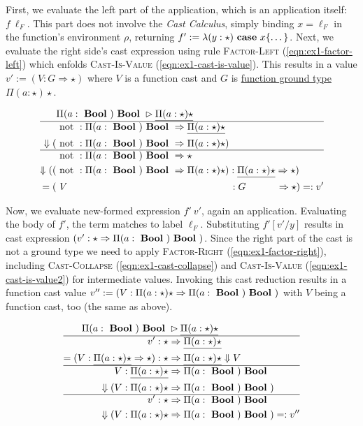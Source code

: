 First, we evaluate the left part of the application, which is an application itself: $f~\ell_F$. This part does not involve the \emph{Cast Calculus}, simply binding $x=\ell_F$ in the function's environment $\rho$, returning $f' := \lambda (y:\star) \text{ \textbf{case} } x \{ \dots \}$. Next, we evaluate the right side's cast expression using rule \textsc{Factor-Left} (\ref{eqn:ex1-factor-left}) which enfolds \textsc{Cast-Is-Value} (\ref{eqn:ex1-cast-is-value}). This results in a value $v' := (V : G \Rightarrow \star)$ where $V$ is a function cast and $G$ is \underline{function ground type} $\Pi(a:\star)\star$.

\begin{align}
& \Pi(a:\Bool) \Bool \rhd \underline{\Pi(a:\star) \star} \\ \hline
& \notf : \Pi(a:\Bool) \Bool \Rightarrow \underline{\Pi(a:\star) \star} \\
\Downarrow ( & \notf : \Pi(a:\Bool) \Bool \Rightarrow \Pi(a:\star) \star ) \label{eqn:ex1-cast-is-value} \\ \hline
& \notf : \Pi(a:\Bool) \Bool \Rightarrow \star \\
\Downarrow (( & \notf : \Pi(a:\Bool) \Bool \Rightarrow \Pi(a:\star) \star) : \underline{\Pi(a:\star) \star} \Rightarrow \star) \label{eqn:ex1-factor-left} \\
= (& ~V \hspace{16.6em} : G \hspace{3.1em} \Rightarrow \star) =: v'
\end{align}

Now, we evaluate new-formed expression $f'~v'$, again an application. Evaluating the body of $f'$, the \case term matches to label $\ell_F$. Substituting $f'[v'/y]$ results in cast expression $(v' : \star \Rightarrow \Pi(a:\text{ \textbf{Bool} }) \text{ \textbf{Bool} })$. Since the right part of the cast is not a ground type we need to apply \textsc{Factor-Right} (\ref{eqn:ex1-factor-right}), including \textsc{Cast-Collapse} (\ref{eqn:ex1-cast-collapse}) and \textsc{Cast-Is-Value} (\ref{eqn:ex1-cast-is-value2}) for intermediate values. Invoking this cast reduction results in a function cast value $v'' := (V : \Pi(a: \star) \star \Rightarrow \Pi(a:\text{ \textbf{Bool} }) \text{ \textbf{Bool} })$ with $V$ being a function cast, too (the same as above).

\begin{align}
\Pi(a:\text{ \textbf{Bool} }) \text{ \textbf{Bool} } & \rhd \underline{\Pi(a:\star)\star} \\ \hline
v' : \star & \Rightarrow \underline{\Pi(a:\star)\star} \\
= ( V : \underline{\Pi(a:\star) \star} \Rightarrow \star) : \star & \Rightarrow \underline{\Pi(a:\star) \star}
\Downarrow V \label{eqn:ex1-cast-collapse} \\ \hline
V : \underline{\Pi(a:\star) \star} & \Rightarrow \Pi(a:\text{ \textbf{Bool} }) \text{ \textbf{Bool} } \\
\Downarrow (V : \Pi(a:\star) \star & \Rightarrow \Pi(a:\text{ \textbf{Bool} }) \text{ \textbf{Bool} }) \label{eqn:ex1-cast-is-value2} \\ \hline
v' : \star & \Rightarrow \Pi(a:\text{ \textbf{Bool} }) \text{ \textbf{Bool} } \\
\Downarrow (V : \Pi(a:\star) \star & \Rightarrow \Pi(a:\text{ \textbf{Bool} }) \text{ \textbf{Bool} }) =: v'' \label{eqn:ex1-factor-right}
\end{align}

